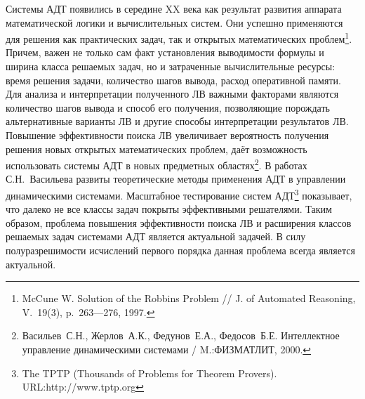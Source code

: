 \documentclass[a4paper]{report}
\begin{document}


Системы АДТ появились в середине XX века как результат развития аппарата математической логики и вычислительных систем. Они успешно применяются для решения как практических задач, так и открытых математических проблем\footnote{McCune W. Solution of the Robbins Problem // J. of Automated Reasoning, V.~19(3), p.~263---276, 1997.}. Причем, важен не только сам факт установления выводимости формулы и ширина класса решаемых задач, но и затраченные вычислительные ресурсы: время решения задачи, количество шагов вывода, расход оперативной памяти. Для анализа и интерпретации полученного ЛВ важными факторами являются количество шагов вывода и способ его получения, позволяющие порождать альтернативные варианты ЛВ и другие способы интерпретации результатов ЛВ. Повышение эффективности поиска ЛВ увеличивает вероятность получения решения новых открытых математических проблем, даёт возможность использовать системы АДТ в новых предметных областях\footnote{Васильев~С.Н., Жерлов~А.К., Федунов~Е.А., Федосов~Б.Е.  Интеллектное управление динамическими системами /  M.:ФИЗМАТЛИТ, 2000.}. В работах С.Н.~Васильева развиты теоретические методы применения АДТ в управлении динамическими системами. Масштабное тестирование систем АДТ\footnote{The TPTP (Thousands of Problems for Theorem Provers). URL:http://www.tptp.org} показывает, что далеко не все классы задач покрыты эффективными решателями. Таким образом, проблема повышения эффективности поиска ЛВ и расширения классов решаемых задач системами АДТ является актуальной задачей. В силу полуразрешимости исчислений первого порядка данная проблема всегда является актуальной.
\end{document}
